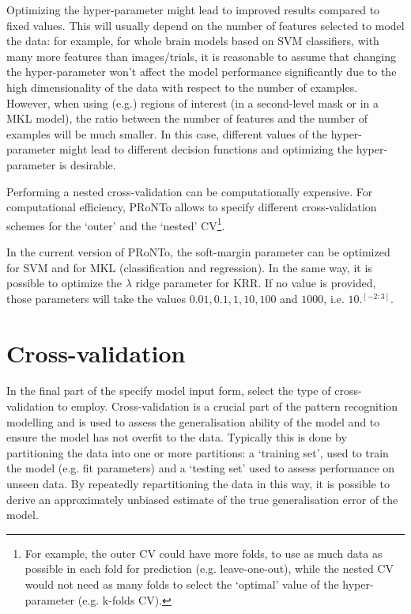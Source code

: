 Optimizing the hyper-parameter might lead to improved results compared to fixed values. This will usually depend on the number of features selected to model the data: for example, for whole brain models based on SVM classifiers, with many more features than images/trials, it is reasonable to assume that changing the hyper-parameter won't affect the model performance significantly due to the high dimensionality of the data with respect to the number of examples. However, when using (e.g.) regions of interest (in a second-level mask or in a MKL model), the ratio between the number of features and the number of examples will be much smaller. In this case, different values of the hyper-parameter might lead to different decision functions and optimizing the hyper-parameter is desirable.

Performing a nested cross-validation can be computationally expensive. For computational efficiency, PRoNTo allows to specify different cross-validation schemes for the `outer' and the `nested' CV\footnote{For example, the outer CV could have more folds, to use as much data as possible in each fold for prediction (e.g. leave-one-out), while the nested CV would not need as many folds to select the `optimal' value of the hyper-parameter (e.g. k-folds CV).}. 

In the current version of PRoNTo, the soft-margin parameter can be optimized for SVM and for MKL (classification and regression). In the same way, it is possible to optimize the $\lambda$ ridge parameter for KRR. If no value is provided, those parameters will take the values $0.01, 0.1, 1, 10, 100$ and $1000$, i.e. $10.^{[-2:3]}$.

\section{Cross-validation}

In the final part of the specify model input form, select the type of cross-validation to employ. Cross-validation is a crucial part of the
pattern recognition modelling and is used to assess the generalisation ability of the model and to ensure the model has not overfit to the data. Typically this is done by
partitioning the data into one or more partitions: a `training set', used to train the model (e.g. fit parameters) and a `testing set' used to assess performance on unseen data. By repeatedly repartitioning the data in this way, it is possible to derive an approximately unbiased estimate of the true generalisation error of the model. 


